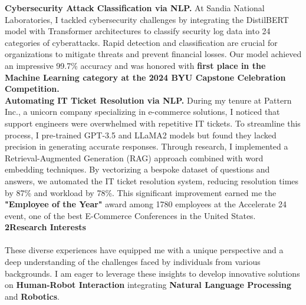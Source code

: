\documentclass{article}
\begin{document}
\textbf{Cybersecurity Attack Classification via NLP.} At Sandia National Laboratories, I tackled cybersecurity challenges by integrating the DistilBERT model with Transformer architectures to classify security log data into 24 categories of cyberattacks. Rapid detection and classification are crucial for organizations to mitigate threats and prevent financial losses. Our model achieved an impressive 99.7\% accuracy and was honored with \textbf{first place in the Machine Learning category at the 2024 BYU Capstone Celebration Competition.}
\\

\textbf{Automating IT Ticket Resolution via NLP.} During my tenure at Pattern Inc., a unicorn company specializing in e-commerce solutions, I noticed that support engineers were overwhelmed with repetitive IT tickets. To streamline this process, I pre-trained GPT-3.5 and LLaMA2 models but found they lacked precision in generating accurate responses. Through research, I implemented a Retrieval-Augmented Generation (RAG) approach combined with word embedding techniques. By vectorizing a bespoke dataset of questions and answers, we automated the IT ticket resolution system, reducing resolution times by 87\% and workload by 78\%. This significant improvement earned me the \textbf{"Employee of the Year"} award among 1780 employees at the Accelerate 24 event, one of the best E-Commerce Conferences in the United States.
\\


\Large\textbf{2\hspace{1em}Research Interests}\normalsize
\\
\\
These diverse experiences have equipped me with a unique perspective and a deep understanding of the challenges faced by individuals from various backgrounds. I am eager to leverage these insights to develop innovative solutions on \textbf{Human-Robot Interaction} integrating \textbf{Natural Language Processing} and \textbf{Robotics}. 
\\
\end{document}
